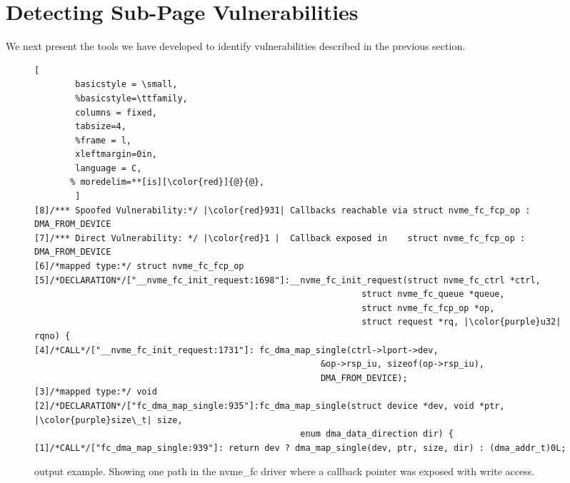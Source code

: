 \section{Detecting Sub-Page Vulnerabilities}
We next present the tools we have developed to identify \subpage vulnerabilities described in the previous section.

\begin{figure*}
\begin{adjustbox}{width=\linewidth}
        \begin{lstlisting}[
        basicstyle = \small,
        %basicstyle=\ttfamily,
        columns = fixed,
        tabsize=4,
        %frame = l,
        xleftmargin=0in,
        language = C,
       % moredelim=**[is][\color{red}]{@}{@},
        ]
[8]/*** Spoofed Vulnerability:*/ |\color{red}931| Callbacks reachable via struct nvme_fc_fcp_op : DMA_FROM_DEVICE
[7]/*** Direct Vulnerability: */ |\color{red}1 |  Callback exposed in    struct nvme_fc_fcp_op : DMA_FROM_DEVICE
[6]/*mapped type:*/ struct nvme_fc_fcp_op
[5]/*DECLARATION*/["__nvme_fc_init_request:1698"]:__nvme_fc_init_request(struct nvme_fc_ctrl *ctrl,
                                                                struct nvme_fc_queue *queue, 
                                                                struct nvme_fc_fcp_op *op, 
                                                                struct request *rq, |\color{purple}u32| rqno) {
[4]/*CALL*/["__nvme_fc_init_request:1731"]: fc_dma_map_single(ctrl->lport->dev,
                                                        &op->rsp_iu, sizeof(op->rsp_iu),
                                                        DMA_FROM_DEVICE);
[3]/*mapped type:*/ void
[2]/*DECLARATION*/["fc_dma_map_single:935"]:fc_dma_map_single(struct device *dev, void *ptr, |\color{purple}size\_t| size, 
                                                    enum dma_data_direction dir) {
[1]/*CALL*/["fc_dma_map_single:939"]: return dev ? dma_map_single(dev, ptr, size, dir) : (dma_addr_t)0L;

                \end{lstlisting}
\end{adjustbox}
        \caption{\tool output example. Showing one path in the nvme\_fc driver where a callback pointer was exposed with write access.}
        \label{fig:tool_example}

\end{figure*}

